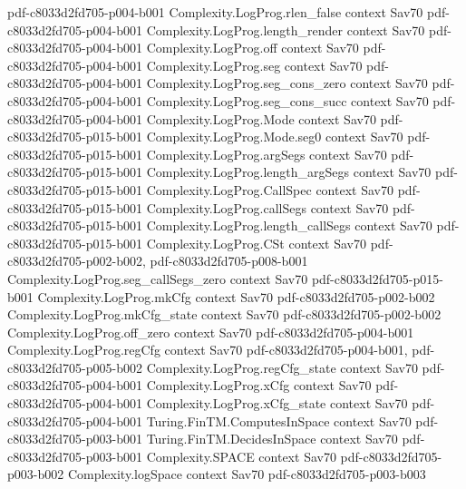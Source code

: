 \begin{theorem}
  {pdf-c8033d2fd705-p004-b001}
\proofstep
  {Complexity.LogProg.rlen_false}
  {context}
  {Sav70}
  {pdf-c8033d2fd705-p004-b001}
\proofstep
  {Complexity.LogProg.length_render}
  {context}
  {Sav70}
  {pdf-c8033d2fd705-p004-b001}
\proofstep
  {Complexity.LogProg.off}
  {context}
  {Sav70}
  {pdf-c8033d2fd705-p004-b001}
\proofstep
  {Complexity.LogProg.seg}
  {context}
  {Sav70}
  {pdf-c8033d2fd705-p004-b001}
\proofstep
  {Complexity.LogProg.seg_cons_zero}
  {context}
  {Sav70}
  {pdf-c8033d2fd705-p004-b001}
\proofstep
  {Complexity.LogProg.seg_cons_succ}
  {context}
  {Sav70}
  {pdf-c8033d2fd705-p004-b001}
\proofstep
  {Complexity.LogProg.Mode}
  {context}
  {Sav70}
  {pdf-c8033d2fd705-p015-b001}
\proofstep
  {Complexity.LogProg.Mode.seg0}
  {context}
  {Sav70}
  {pdf-c8033d2fd705-p015-b001}
\proofstep
  {Complexity.LogProg.argSegs}
  {context}
  {Sav70}
  {pdf-c8033d2fd705-p015-b001}
\proofstep
  {Complexity.LogProg.length_argSegs}
  {context}
  {Sav70}
  {pdf-c8033d2fd705-p015-b001}
\proofstep
  {Complexity.LogProg.CallSpec}
  {context}
  {Sav70}
  {pdf-c8033d2fd705-p015-b001}
\proofstep
  {Complexity.LogProg.callSegs}
  {context}
  {Sav70}
  {pdf-c8033d2fd705-p015-b001}
\proofstep
  {Complexity.LogProg.length_callSegs}
  {context}
  {Sav70}
  {pdf-c8033d2fd705-p015-b001}
\proofstep
  {Complexity.LogProg.CSt}
  {context}
  {Sav70}
  {pdf-c8033d2fd705-p002-b002,
    pdf-c8033d2fd705-p008-b001}
\proofstep
  {Complexity.LogProg.seg_callSegs_zero}
  {context}
  {Sav70}
  {pdf-c8033d2fd705-p015-b001}
\proofstep
  {Complexity.LogProg.mkCfg}
  {context}
  {Sav70}
  {pdf-c8033d2fd705-p002-b002}
\proofstep
  {Complexity.LogProg.mkCfg_state}
  {context}
  {Sav70}
  {pdf-c8033d2fd705-p002-b002}
\proofstep
  {Complexity.LogProg.off_zero}
  {context}
  {Sav70}
  {pdf-c8033d2fd705-p004-b001}
\proofstep
  {Complexity.LogProg.regCfg}
  {context}
  {Sav70}
  {pdf-c8033d2fd705-p004-b001,
    pdf-c8033d2fd705-p005-b002}
\proofstep
  {Complexity.LogProg.regCfg_state}
  {context}
  {Sav70}
  {pdf-c8033d2fd705-p004-b001}
\proofstep
  {Complexity.LogProg.xCfg}
  {context}
  {Sav70}
  {pdf-c8033d2fd705-p004-b001}
\proofstep
  {Complexity.LogProg.xCfg_state}
  {context}
  {Sav70}
  {pdf-c8033d2fd705-p004-b001}
\proofstep
  {Turing.FinTM.ComputesInSpace}
  {context}
  {Sav70}
  {pdf-c8033d2fd705-p003-b001}
\proofstep
  {Turing.FinTM.DecidesInSpace}
  {context}
  {Sav70}
  {pdf-c8033d2fd705-p003-b001}
\proofstep
  {Complexity.SPACE}
  {context}
  {Sav70}
  {pdf-c8033d2fd705-p003-b002}
\proofstep
  {Complexity.logSpace}
  {context}
  {Sav70}
  {pdf-c8033d2fd705-p003-b003}
\proofstep

\end{theorem}
